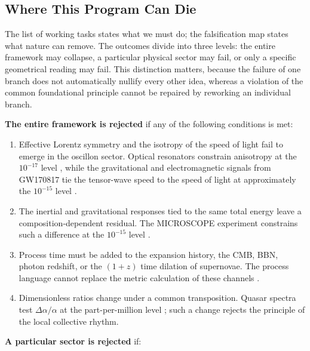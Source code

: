 \documentclass[11pt,a4paper]{article}
\begin{document}
\subsection{Where This Program Can Die}

The list of working tasks states what we must do; the falsification map states what nature can remove. The outcomes divide into three levels: the entire framework may collapse, a particular physical sector may fail, or only a specific geometrical reading may fail. This distinction matters, because the failure of one branch does not automatically nullify every other idea, whereas a violation of the common foundational principle cannot be repaired by reworking an individual branch.

\textbf{The entire framework is rejected} if any of the following conditions is met:

\begin{enumerate}
\item Effective Lorentz symmetry and the isotropy of the speed of light fail to emerge in the oscillon sector. Optical resonators constrain anisotropy at the $10^{-17}$ level \citep{herrmann2009}, while the gravitational and electromagnetic signals from GW170817 tie the tensor-wave speed to the speed of light at approximately the $10^{-15}$ level \citep{abbott2017}.
\item The inertial and gravitational responses tied to the same total energy leave a composition-dependent residual. The MICROSCOPE experiment constrains such a difference at the $10^{-15}$ level \citep{touboul2022}.
\item Process time must be added to the expansion history, the CMB, BBN, photon redshift, or the $(1+z)$ time dilation of supernovae. The process language cannot replace the metric calculation of these channels \citep{blondin2008}.
\item Dimensionless ratios change under a common transposition. Quasar spectra test $\Delta\alpha/\alpha$ at the part-per-million level \citep{kotus2017}; such a change rejects the principle of the local collective rhythm.
\end{enumerate}

\textbf{A particular sector is rejected} if:
\end{document}
